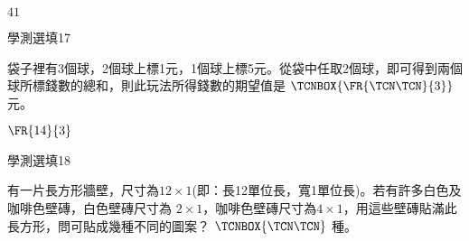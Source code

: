 \begin{QUESTIONS}
\begin{QUESTION}
\begin{QBODY}
        \end{QBODY}
        \begin{QFROMS}
        \end{QFROMS}
        \begin{QTAGS}\end{QTAGS}
        \begin{QANS}
            $41$
        \end{QANS}
        \begin{QSOLLIST}
        \end{QSOLLIST}
        \begin{QEMPTYSPACE}
        \end{QEMPTYSPACE}
    \end{QUESTION}
    \begin{QUESTION}
        \begin{ExamInfo}{88}{學測}{選填}{17}
        \end{ExamInfo}
        \begin{ExamAnsRateInfo}{}{}{}{}
        \end{ExamAnsRateInfo}
        \begin{QBODY}
            袋子裡有3個球，2個球上標1元，1個球上標5元。從袋中任取2個球，即可得到兩個球所標錢數的總和，則此玩法所得錢數的期望值是
            $\TCNBOX{\FR{\TCN\TCN}{3}}$
               元。

        \end{QBODY}
        \begin{QFROMS}
        \end{QFROMS}
        \begin{QTAGS}\end{QTAGS}
        \begin{QANS}
            $\FR{14}{3}$
        \end{QANS}
        \begin{QSOLLIST}
        \end{QSOLLIST}
        \begin{QEMPTYSPACE}
        \end{QEMPTYSPACE}
    \end{QUESTION}
    \begin{QUESTION}
        \begin{ExamInfo}{88}{學測}{選填}{18}
        \end{ExamInfo}
        \begin{ExamAnsRateInfo}{}{}{}{}
        \end{ExamAnsRateInfo}
        \begin{QBODY}
            有一片長方形牆壁，尺寸為$12\times 1$(即：長12單位長，寬1單位長)。若有許多白色及咖啡色壁磚，白色壁磚尺寸為 $2\times 1$，咖啡色壁磚尺寸為$4\times 1$，用這些壁磚貼滿此長方形，問可貼成幾種不同的圖案？
            $\TCNBOX{\TCN\TCN}$ 種。
            

\end{QBODY}
\end{QUESTION}
\end{QUESTIONS}
